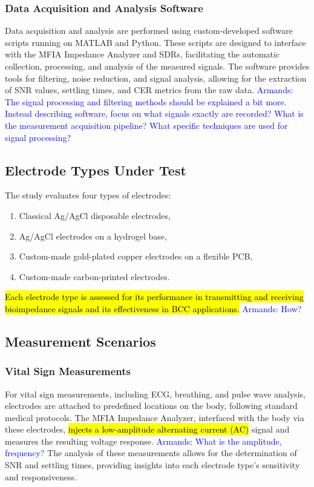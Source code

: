 \documentclass[conference]{IEEEtran}
\newcommand{\notea}[1]{\textcolor{blue}{Armands: #1}}
\begin{document}
\subsubsection{Data Acquisition and Analysis Software}
Data acquisition and analysis are performed using custom-developed software scripts running on MATLAB and Python. These scripts are designed to interface with the MFIA Impedance Analyzer and SDRs, facilitating the automatic collection, processing, and analysis of the measured signals. The software provides tools for filtering, noise reduction, and signal analysis, allowing for the extraction of SNR values, settling times, and CER metrics from the raw data. \notea{The signal processing and filtering methods should be explained a bit more. Instead describing software, focus on what signals exactly are recorded? What is the measurement acquisition pipeline? What specific techniques are used for signal processing? }

\subsection{Electrode Types Under Test}

The study evaluates four types of electrodes:
\begin{enumerate}
    \item Classical Ag/AgCl disposable electrodes,
    \item Ag/AgCl electrodes on a hydrogel base,
    \item Custom-made gold-plated copper electrodes on a flexible PCB,
    \item Custom-made carbon-printed electrodes.
\end{enumerate}
\hl{Each electrode type is assessed for its performance in transmitting and receiving bioimpedance signals and its effectiveness in BCC applications.} \notea{How?}

\subsection{Measurement Scenarios}

\subsubsection{Vital Sign Measurements}
For vital sign measurements, including ECG, breathing, and pulse wave analysis, electrodes are attached to predefined locations on the body, following standard medical protocols. The MFIA Impedance Analyzer, interfaced with the body via these electrodes, \hl{injects a low-amplitude alternating current (AC)} signal and measures the resulting voltage response. \notea{What is the amplitude, frequency?} The analysis of these measurements allows for the determination of SNR and settling times, providing insights into each electrode type's sensitivity and responsiveness.
\end{document}
